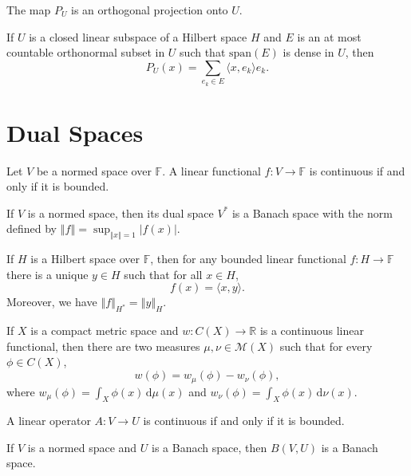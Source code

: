\documentclass[a4paper]{article}
\newcommand{\F}{\mathbb{F}}
\newcommand{\R}{\mathbb{R}}
\newcommand{\integ}[4]{\int_{#1}^{#2}\!{#3}\,\mathrm{d}{#4}}
\newcommand{\norm}[1]{\left\Vert #1 \right\Vert}
\newcommand{\<}{\langle}
\renewcommand{\>}{\rangle}
\renewcommand{\span}{\mathrm{span}}
\begin{document}
\begin{prop}
  The map $P_U$ is an orthogonal projection onto $U$.
\end{prop}

\begin{prop}
  If $U$ is a closed linear subspace of a Hilbert space $H$ and $E$ is an at most countable orthonormal subset in $U$ such that $\span(E)$ is dense in $U$, then
  $$P_U(x) = \sum_{e_k\in E}\<x,e_k\>e_k.$$
\end{prop}

\section{Dual Spaces}

\begin{prop}
  Let $V$ be a normed space over $\F$. A linear functional $f:V\to\F$ is continuous if and only if it is bounded.
\end{prop}

\begin{prop}
  If $V$ is a normed space, then its dual space $V^*$ is a Banach space with the norm defined by $\norm{f}=\sup_{\norm{x}=1}|f(x)|$.
\end{prop}

\begin{thm}
  If $H$ is a Hilbert space over $\F$, then for any bounded linear functional $f:H\to\F$ there is a unique $y\in H$ such that for all $x\in H$,
  $$f(x) = \<x,y\>.$$
  Moreover, we have $\norm{f}_{H^*} = \norm{y}_H$.
\end{thm}

\begin{thm}
  If $X$ is a compact metric space and $w:C(X)\to\R$ is a continuous linear functional, then there are two measures $\mu,\nu\in\mathcal{M}(X)$ such that for every $\phi\in C(X)$,
  $$w(\phi) = w_\mu(\phi) - w_\nu(\phi),$$
  where $ w_\mu(\phi) = \integ{X}{}{\phi(x)}{\mu(x)}$ and $w_\nu(\phi) = \integ{X}{}{\phi(x)}{\nu(x)}$.
\end{thm}

\begin{lemma}
  A linear operator $A:V\to U$ is continuous if and only if it is bounded.
\end{lemma}

\begin{thm}
  If $V$ is a normed space and $U$ is a Banach space, then $B(V,U)$ is a Banach space.
\end{thm}
\end{document}
